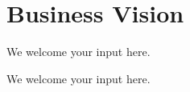 \section{Business Vision}\label{sec:ekg-mm-a-1-1}

We welcome your input here.

\ekgmmContextSection

We welcome your input here.
